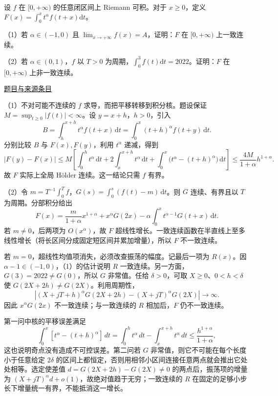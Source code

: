 \documentclass[12pt,fontset=fandol]{ctexart}
\begin{document}
\begin{example}[来源序号6]\label{ex:ch04-14th-A:6}\label{pr:ch04-14th-A:6}

设 $f$ 在 $[0,+\infty)$ 的任意闭区间上 Riemann 可积。对于 $x\geq 0$，定义 $F(x)=\int_{0}^{x}t^{\alpha}f(t+x)\mathrm{d}t$。

（1）若 $\alpha\in(-1,0)$ 且 $\lim_{x\rightarrow+\infty}f(x)=A$，证明：$F$ 在 $[0,+\infty)$ 上一致连续。

（2）若 $\alpha\in(0,1)$，$f$ 以 $T>0$ 为周期，$\int_{0}^{3}f(t)\mathrm{d}t=2022$。证明：$F$ 在 $[0,+\infty)$ 上非一致连续。

\par\href{https://github.com/lzxcr/cmc-mathematics/blob/64916fa1fdbc3e444a652eca204d5669058ee321/src/problems/preliminary/14/06.md}{题目与来源条目}

\end{example}

\begin{solve}\label{ans:ch04-14th-A:6}

（1）不对可能不连续的 $f$ 求导，而把平移转移到积分核。题设保证 $M=\sup_{t\geq0}|f(t)|<\infty$。设 $y=x+h$，$h>0$，引入
\[
B=\int_h^{x+h}t^\alpha f(t+x)\,\mathrm dt
=\int_0^x(t+h)^\alpha f(t+y)\,\mathrm dt.
\]
分别比较 $B$ 与 $F(x),F(y)$，利用 $t^\alpha$ 递减，得到
\[
|F(y)-F(x)|\leq M\left[
\int_0^h t^\alpha\,\mathrm dt
+2\int_x^{x+h}t^\alpha\,\mathrm dt
+\int_0^x\bigl(t^\alpha-(t+h)^\alpha\bigr)\,\mathrm dt\right]
\leq\frac{4M}{1+\alpha}h^{1+\alpha}.
\]
故 $F$ 实际上全局 Hölder 连续。这一结论只需 $f$ 有界。

（2）令 $m=T^{-1}\int_0^T f$，$G(s)=\int_0^s(f(t)-m)\,\mathrm dt$。则 $G$ 连续、有界且以 $T$ 为周期。分部积分给出
\[
F(x)=\frac{m}{1+\alpha}x^{1+\alpha}
+x^\alpha G(2x)
-\alpha\int_0^x t^{\alpha-1}G(t+x)\,\mathrm dt.
\]
若 $m\neq0$，后两项为 $O(x^\alpha)$，故 $F$ 超线性增长。一致连续函数在半直线上至多线性增长（将长区间分成固定短区间并累加增量），所以 $F$ 不一致连续。

若 $m=0$，超线性均值项消失，必须改查振荡的幅度。记最后一项为 $R(x)$。因 $\alpha-1\in(-1,0)$，（1）的估计说明 $R$ 一致连续。另一方面，$G(3)=2022\neq G(0)$，所以 $G$ 非常值。任给 $\delta>0$，可取 $X\geq0$、$0<h<\delta$ 使 $G(2X+2h)\neq G(2X)$。利用周期性，
\[
\left|(X+jT+h)^\alpha G(2X+2h)
 -(X+jT)^\alpha G(2X)\right|\longrightarrow\infty.
\]
因此 $x^\alpha G(2x)$ 不一致连续；与一致连续的 $R$ 相加后，$F$ 仍不一致连续。

第一问中核的平移误差满足
\[
\int_0^x[t^\alpha-(t+h)^\alpha]\,dt
=\int_0^h t^\alpha\,dt-\int_x^{x+h}t^\alpha\,dt
\le\frac{h^{1+\alpha}}{1+\alpha},
\]
这也说明奇点没有造成不可控误差。第二问若 $G$ 非常值，则它不可能在每个长度小于任意给定 $2\delta$ 的区间上都恒定，否则用相邻小区间连接任意两点就会推出它处处相等。选定使差值 $d=G(2X+2h)-G(2X)\ne0$ 的两点后，振荡项的增量为 $(X+jT)^\alpha d+o(1)$，故绝对值趋于无穷；一致连续的 $R$ 在固定的足够小步长下增量统一有界，不能抵消这一增长。

\end{solve}
\end{document}
